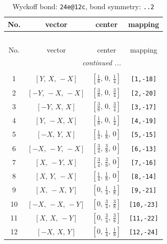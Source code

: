 \documentclass[fleqn,8pt]{jsarticle}
\begin{document}
\renewcommand{\arraystretch}{1.2}
\begin{longtable}{cccc}
\caption{Wyckoff bond: {\tt 24e@12c}, bond symmetry: {\tt ..2}}
 \\
 \hline \hline
No. & vector & center & mapping \\ \hline \endfirsthead

\multicolumn{3}{l}{\tablename\ \thetable{}} \\
 \hline \hline
No. & vector & center & mapping \\ \hline \endhead

 \hline \hline
\multicolumn{3}{r}{\footnotesize\it continued ...} \\ \endfoot

 \hline \hline
\multicolumn{3}{r}{} \\ \endlastfoot

1 & $\left[ Y,\, X,\, - X \right]$ & $\left[ \frac{1}{8},\, 0,\, \frac{1}{4} \right]$ & {\tt [1,-18]} \\ \hline
2 & $\left[ - Y,\, - X,\, - X \right]$ & $\left[ \frac{3}{8},\, 0,\, \frac{3}{4} \right]$ & {\tt [2,-20]} \\ \hline
3 & $\left[ - Y,\, X,\, X \right]$ & $\left[ \frac{3}{8},\, 0,\, \frac{3}{4} \right]$ & {\tt [3,-17]} \\ \hline
4 & $\left[ Y,\, - X,\, X \right]$ & $\left[ \frac{1}{8},\, 0,\, \frac{1}{4} \right]$ & {\tt [4,-19]} \\ \hline
5 & $\left[ - X,\, Y,\, X \right]$ & $\left[ \frac{1}{4},\, \frac{1}{8},\, 0 \right]$ & {\tt [5,-15]} \\ \hline
6 & $\left[ - X,\, - Y,\, - X \right]$ & $\left[ \frac{3}{4},\, \frac{3}{8},\, 0 \right]$ & {\tt [6,-13]} \\ \hline
7 & $\left[ X,\, - Y,\, X \right]$ & $\left[ \frac{3}{4},\, \frac{3}{8},\, 0 \right]$ & {\tt [7,-16]} \\ \hline
8 & $\left[ X,\, Y,\, - X \right]$ & $\left[ \frac{1}{4},\, \frac{1}{8},\, 0 \right]$ & {\tt [8,-14]} \\ \hline
9 & $\left[ X,\, - X,\, Y \right]$ & $\left[ 0,\, \frac{1}{4},\, \frac{1}{8} \right]$ & {\tt [9,-21]} \\ \hline
10 & $\left[ - X,\, - X,\, - Y \right]$ & $\left[ 0,\, \frac{3}{4},\, \frac{3}{8} \right]$ & {\tt [10,-23]} \\ \hline
11 & $\left[ X,\, X,\, - Y \right]$ & $\left[ 0,\, \frac{3}{4},\, \frac{3}{8} \right]$ & {\tt [11,-22]} \\ \hline
12 & $\left[ - X,\, X,\, Y \right]$ & $\left[ 0,\, \frac{1}{4},\, \frac{1}{8} \right]$ & {\tt [12,-24]} \\
\end{longtable}
\end{document}
